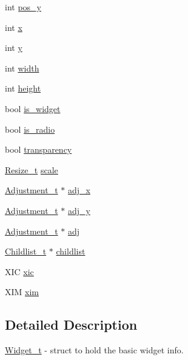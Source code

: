 \begin{DoxyCompactItemize}
\item 
int \hyperlink{structWidget__t_a9b127ac6b3f017b367351ee673e063c3}{pos\+\_\+y}
\item 
int \hyperlink{structWidget__t_aac6ce7621b682bb4ce88bac9181c34a7}{x}
\item 
int \hyperlink{structWidget__t_acb9402de44e47837e1821b93fc052b38}{y}
\item 
int \hyperlink{structWidget__t_a3204c88196ed5793250b3530dd719037}{width}
\item 
int \hyperlink{structWidget__t_a1def6d2237743e75a0b84ca0c34a6834}{height}
\item 
bool \hyperlink{structWidget__t_aff0b7ecbf87b995342d13e2efe79dfca}{is\+\_\+widget}
\item 
bool \hyperlink{structWidget__t_acb0bba70f001420ed9a33128c10e74ed}{is\+\_\+radio}
\item 
bool \hyperlink{structWidget__t_a42a597c21eca964c0296fc7026feb43b}{transparency}
\item 
\hyperlink{structResize__t}{Resize\+\_\+t} \hyperlink{structWidget__t_a9a2d5b53f40f5bf3914fc0694027d7ec}{scale}
\item 
\hyperlink{structAdjustment__t}{Adjustment\+\_\+t} $\ast$ \hyperlink{structWidget__t_aabc05e0a46c85d24483fae36127b45dd}{adj\+\_\+x}
\item 
\hyperlink{structAdjustment__t}{Adjustment\+\_\+t} $\ast$ \hyperlink{structWidget__t_abde95d3fb49faff5dd852f16810115e7}{adj\+\_\+y}
\item 
\hyperlink{structAdjustment__t}{Adjustment\+\_\+t} $\ast$ \hyperlink{structWidget__t_af3fdf65eb9a663016b91ee87a96d75a8}{adj}
\item 
\hyperlink{structChildlist__t}{Childlist\+\_\+t} $\ast$ \hyperlink{structWidget__t_ac203ccbc58958a7c205897d4aba197e9}{childlist}
\item 
X\+IC \hyperlink{structWidget__t_adafb1b98ea551ef726be6c726ac2e817}{xic}
\item 
X\+IM \hyperlink{structWidget__t_a81aa76d336043a7230844d09a92113e2}{xim}
\end{DoxyCompactItemize}


\subsection{Detailed Description}
\hyperlink{structWidget__t}{Widget\+\_\+t} -\/ struct to hold the basic widget info. 


